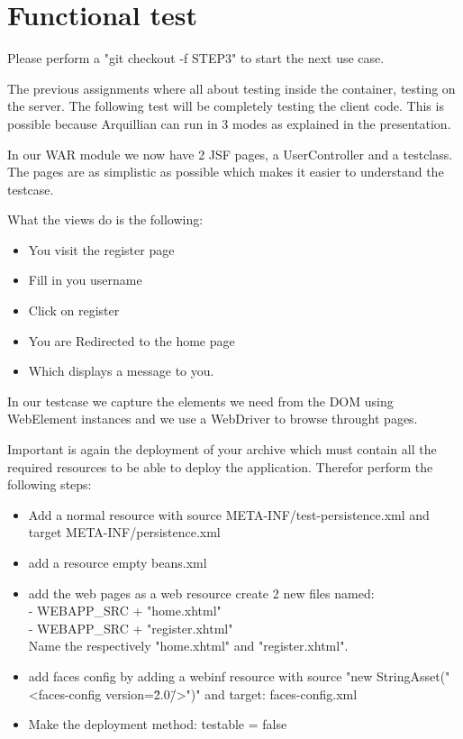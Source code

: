 \documentclass[paper=a4, fontsize=11pt]{scrartcl}
\begin{document}
\section{Functional test}
Please perform a "git checkout -f STEP3" to start the next use case.
\par
The previous assignments where all about testing inside the container, testing on
the server. The following test will be completely testing the client code. This
is possible because Arquillian can run in 3 modes as explained in the presentation.
\par
In our WAR module we now have 2 JSF pages, a UserController and a testclass. The
pages are as simplistic as possible which makes it easier to understand the
testcase.
\par
What the views do is the following:
\begin{itemize}
	\item You visit the register page
	\item Fill in you username
	\item Click on register
	\item You are Redirected to the home page
	\item Which displays a message to you.
\end{itemize}
In our testcase we capture the elements we need from the DOM using WebElement
instances and we use a WebDriver to browse throught pages.
\par
Important is again the deployment of your archive which must contain all the
required resources to be able to deploy the application. Therefor perform the
following steps:
\begin{itemize}
	\item Add a normal resource with source META-INF/test-persistence.xml and
		target META-INF/persistence.xml
	\item add a resource empty beans.xml
	\item add the web pages as a web resource create 2 new files named:\\
		- WEBAPP\_SRC + "home.xhtml"\\
		- WEBAPP\_SRC + "register.xhtml"\\
		Name the respectively "home.xhtml" and "register.xhtml".
	\item add faces config by adding a webinf resource with source "new StringAsset("<faces-config version=\"2.0\"/>")"
		 and target: faces-config.xml
	\item Make the deployment method: testable = false
\end{itemize}
\end{document}
